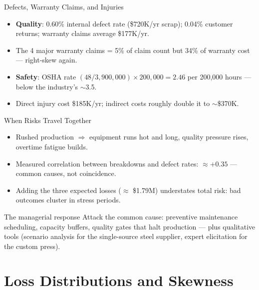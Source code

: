 \documentclass[11pt, aspectratio=169]{beamer}
\begin{document}
\begin{frame}{Defects, Warranty Claims, and Injuries}
\begin{itemize}
  \item \textbf{Quality}: 0.60\% internal defect rate (\$720K/yr scrap); 0.04\% customer returns; warranty claims average \$177K/yr.
  \item The 4 major warranty claims = 5\% of claim count but \alert{34\% of warranty cost} --- right-skew again.
  \item \textbf{Safety}: OSHA rate $(48/3{,}900{,}000) \times 200{,}000 = 2.46$ per 200{,}000 hours --- below the industry's $\sim$3.5.
  \item Direct injury cost \$185K/yr; indirect costs roughly double it to $\sim$\$370K.
\end{itemize}
\end{frame}

\begin{frame}{When Risks Travel Together}
\begin{itemize}
  \item Rushed production $\Rightarrow$ equipment runs hot and long, quality pressure rises, overtime fatigue builds.
  \item Measured correlation between breakdowns and defect rates: $\approx +0.35$ --- common causes, not coincidence.
  \item Adding the three expected losses ($\approx$ \$1.79M) \alert{understates} total risk: bad outcomes cluster in stress periods.
\end{itemize}
\medskip
\begin{block}{The managerial response}
Attack the common cause: preventive maintenance scheduling, capacity buffers, quality gates that halt production --- plus qualitative tools (scenario analysis for the single-source steel supplier, expert elicitation for the custom press).
\end{block}
\end{frame}

\section{Loss Distributions and Skewness}
\end{document}
